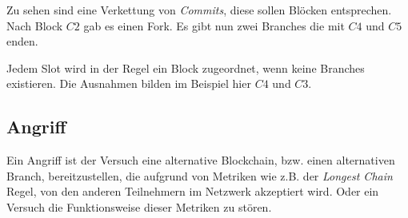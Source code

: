 
Zu sehen sind eine Verkettung von \textit{Commits}, diese sollen Blöcken entsprechen. Nach Block $C2$ gab es einen Fork. Es gibt nun zwei Branches die mit $C4$ und $C5$ enden.

Jedem Slot wird in der Regel ein Block zugeordnet, wenn keine Branches existieren. Die Ausnahmen bilden im Beispiel hier $C4$ und $C3$.

\subsection{Angriff}
\label{subsec:attack}

Ein Angriff ist der Versuch eine alternative Blockchain, bzw. einen alternativen Branch, bereitzustellen, die aufgrund von Metriken wie z.B. der \textit{Longest Chain} Regel, von den anderen Teilnehmern im Netzwerk akzeptiert wird.
Oder ein Versuch die Funktionsweise dieser Metriken zu stören.
